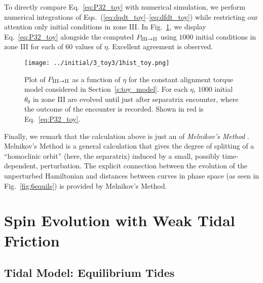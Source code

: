 \documentclass[
        fleqn,
        usenatbib,
    ]{mnras}
\begin{document}
To directly compare Eq.~\eqref{eq:P32_toy} with numerical simulation, we perform
numerical integrations of Eqs.~(\ref{eq:dqdt_toy}--\ref{eq:dfdt_toy}) while
restricting our attention only initial conditions in zone III\@.
In Fig.~\ref{fig:1hist_toy}, we display Eq.~\eqref{eq:P32_toy} alongside the
computed $P_{\rm III \to II}$ using $1000$ initial conditions in zone III for
each of $60$ values of $\eta$. Excellent agreement is observed.
\begin{figure}
    \centering
    \texttt{[image: ../initial/3\_toy3/1hist\_toy.png]}
    \caption{Plot of $P_{\rm III \to II}$ as a function of $\eta$ for the
    constant alignment torque model considered in Section~\ref{s:toy_model}. For
    each $\eta$, $1000$ initial $\theta_0$ in zone III are evolved until just
    after separatrix encounter, where the outcome of the encounter is recorded.
    Shown in red is Eq.~\eqref{eq:P32_toy}.}\label{fig:1hist_toy}
\end{figure}

Finally, we remark that the calculation above is just an of \emph{Melnikov's
Method} \citep{g_and_h}. Melnikov's Method is a general calculation that gives
the degree of splitting of a ``homoclinic orbit'' (here, the separatrix) induced
by a small, possibly time-dependent, perturbation. The explicit connection
between the evolution of the unperturbed Hamiltonian and distances between
curves in phase space (as seen in Fig.~\ref{fig:6equils}) is provided by
Melnikov's Method.

\section{Spin Evolution with Weak Tidal Friction}\label{s:full_tide_prob}

\subsection{Tidal Model: Equilibrium Tides}\label{ss:weaktide}
\end{document}
